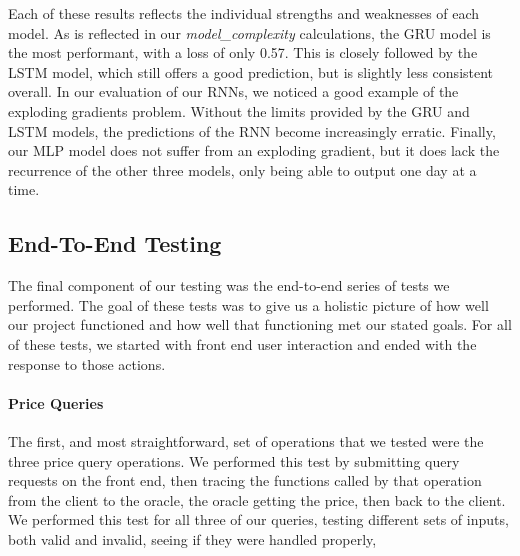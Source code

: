 \documentclass{article}
\begin{document}
    Each of these results reflects the individual strengths and weaknesses of each model.  As is reflected in our
    \textit{model\_complexity} calculations, the GRU model is the most performant, with a loss of only 0.57.  This is
    closely followed by the LSTM model, which still offers a good prediction, but is slightly less consistent overall.
    In our evaluation of our RNNs, we noticed a good example of the exploding gradients problem.  Without the limits
    provided by the GRU and LSTM models, the predictions of the RNN become increasingly erratic.  Finally, our
    MLP model does not suffer from an exploding gradient, but it does lack the recurrence of the other three models,
    only being able to output one day at a time.

    \subsection{End-To-End Testing}

    The final component of our testing was the end-to-end series of tests we performed.  The goal of these tests was to
    give us a holistic picture of how well our project functioned and how well that functioning met our stated goals.
    For all of these tests, we started with front end user interaction and ended with the response to those actions.

    \paragraph{Price Queries}
    The first, and most straightforward, set of operations that we tested were the three price query operations.
    We performed this test by submitting query requests on the front end, then tracing the functions called by that operation
    from the client to the oracle, the oracle getting the price, then back to the client.  We performed this test for all
    three of our queries, testing different sets of inputs, both valid and invalid, seeing if they were handled properly,
\end{document}
